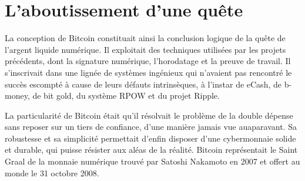 \begin{quote}
\end{quote} %



\section*{L'aboutissement d'une quête}

La conception de Bitcoin constituait ainsi la conclusion logique de la quête de l'argent liquide numérique. Il exploitait des techniques utilisées par les projets précédents, dont la signature numérique, l'horodatage et la preuve de travail. Il s'inscrivait dans une lignée de systèmes ingénieux qui n'avaient pas rencontré le succès escompté à cause de leurs défauts intrinsèques, à l'instar de eCash, de b-money, de bit gold, du système RPOW et du projet Ripple.

La particularité de Bitcoin était qu'il résolvait le problème de la double dépense sans reposer sur un tiers de confiance, d'une manière jamais vue auaparavant. Sa robustesse et sa simplicité permettait d'enfin disposer d'une cybermonnaie solide et durable, qui puisse résister aux aléas de la réalité. Bitcoin représentait le Saint Graal de la monnaie numérique trouvé par Satoshi Nakamoto en 2007 et offert au monde le 31 octobre 2008.

\printendnotes